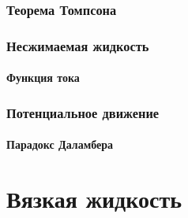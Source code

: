 \documentclass[ucs,english,russian]{beamer}
\begin{document}
\section{Теорема Томпсона}
\section{Несжимаемая жидкость}
\subsection{Функция тока}
\section{Потенциальное движение}
\subsection{Парадокс Даламбера}

\part{Вязкая жидкость}
\end{document}
